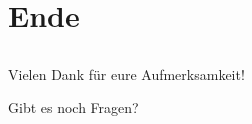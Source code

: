 \documentclass[aspectratio=169]{beamer}
\begin{document}
\section{Ende}
 \subsection{}
\begin{frame}{}
    \begin{center}
        {\Huge Vielen Dank für eure Aufmerksamkeit!}
        
        \vspace{0.8cm}
        
        {\huge Gibt es noch Fragen?}
    \end{center}
\end{frame}
\end{document}

